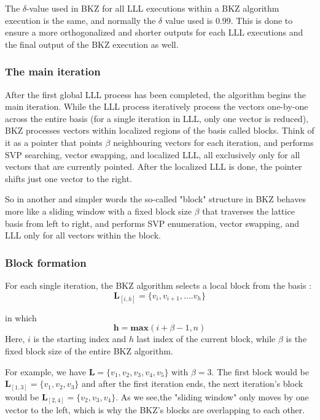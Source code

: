 \documentclass[runningheads]{llncs}
\begin{document}
The $\delta$-value used in BKZ for all LLL executions within a BKZ algorithm execution is the same, and normally the $\delta$ value used is 0.99. This is done to ensure a more orthogonalized and shorter outputs for each LLL executions and the final output of the BKZ execution as well. 

\subsubsection{The main iteration}
\mbox{}
After the first global LLL process has been completed, the algorithm begins the main iteration. While the LLL process iteratively process the vectors one-by-one across the entire basis (for a single iteration in LLL, only one vector is reduced), BKZ processes vectors within localized regions of the basis called blocks. Think of it as a pointer that points $\beta$ neighbouring vectors for each iteration, and performs SVP searching, vector swapping, and localized LLL, all exclusively only for all vectors that are currently pointed. After the localized LLL is done, the pointer shifts just one vector to the right. 

So in another and simpler words the so-called "block" structure in BKZ behaves more like a sliding window with a fixed block size $\beta$ that traverses the lattice basis from left to right, and performs SVP enumeration, vector swapping, and LLL only for all vectors within the block. 

\subsubsection{Block formation}
\mbox{}
For each single iteration, the BKZ algorithm selects a local block from the basis :
$$\mathbf{L}_{[i,h]} = \{v_i, v_{i+1}, ....v_h\}$$

in which $$\mathbf{h} = \mathbf{max}(i+\beta-1, n)$$ %
Here, $i$ is the starting index and $h$ last index of the current block, while $\beta$ is the fixed block size of the entire BKZ algorithm. 

For example, we have $\mathbf{L} = \{v_1, v_2, v_3, v_4, v_5\}$ with $\beta = 3$. The first block would be $\mathbf{L}_{[1,3]} = \{v_1, v_2, v_3\}$ and after the first iteration ends, the next iteration's block would be $\mathbf{L}_{[2,4]} = \{v_2, v_3, v_4\}$. As we see,the "sliding window" only moves by one vector to the left, which is why the BKZ's blocks are overlapping to each other. 
\end{document}
